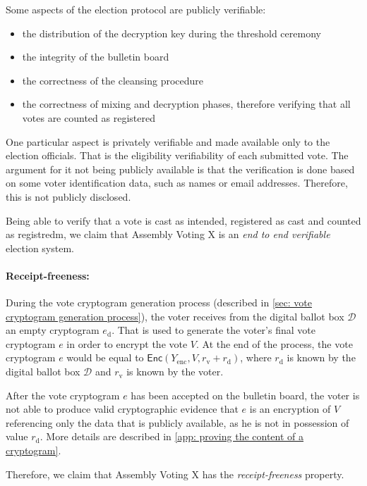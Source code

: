 Some aspects of the election protocol are publicly verifiable:
\begin{itemize}
    \item the distribution of the decryption key during the threshold ceremony
    \item the integrity of the bulletin board
    \item the correctness of the cleansing procedure
    \item the correctness of mixing and decryption phases, therefore verifying that all votes are counted as registered
\end{itemize}

One particular aspect is privately verifiable and made available only to the election officials. That is the eligibility verifiability of each submitted vote. The argument for it not being publicly available is that the verification is done based on some voter identification data, such as names or email addresses. Therefore, this is not publicly disclosed.

Being able to verify that a vote is cast as intended, registered as cast and counted as registredm, we claim that Assembly Voting X is an \textit{end to end verifiable} election system.


\paragraph{Receipt-freeness:}
During the vote cryptogram generation process (described in \cref{sec: vote cryptogram generation process}), the voter receives from the digital ballot box $\mathcal{D}$ an empty cryptogram $e_\mathrm{d}$. That is used to generate the voter's final vote cryptogram $e$ in order to encrypt the vote $V$. At the end of the process, the vote cryptogram $e$ would be equal to $\mathsf{Enc} (Y_\mathrm{enc}, V, r_\mathrm{v} + r_\mathrm{d})$, where $r_\mathrm{d}$ is known by the digital ballot box $\mathcal{D}$ and $r_\mathrm{v}$ is known by the voter.

After the vote cryptogram $e$ has been accepted on the bulletin board, the voter is not able to produce valid cryptographic evidence that $e$ is an encryption of $V$ referencing only the data that is publicly available, as he is not in possession of value $r_\mathrm{d}$. More details are described in \cref{app: proving the content of a cryptogram}.

Therefore, we claim that Assembly Voting X has the \textit{receipt-freeness} property.

